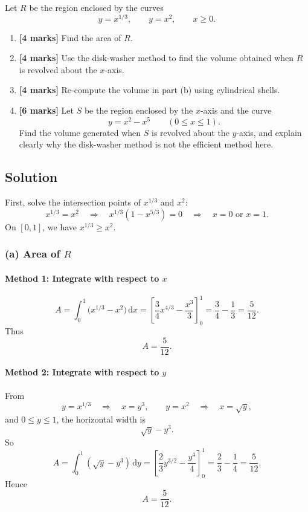 \documentclass[12pt]{article}
\newcommand{\dd}{\,\mathrm{d}}
\begin{document}
Let \(R\) be the region enclosed by the curves
\[
y=x^{1/3},
\qquad
y=x^2,
\qquad
x\ge 0.
\]

\begin{enumerate}[label=(\alph*)]
\item \textbf{[4 marks]} Find the area of \(R\).

\item \textbf{[4 marks]} Use the disk-washer method to find the volume obtained when \(R\) is revolved about the \(x\)-axis.

\item \textbf{[4 marks]} Re-compute the volume in part (b) using cylindrical shells.

\item \textbf{[6 marks]} Let \(S\) be the region enclosed by the \(x\)-axis and the curve
\[
y=x^2-x^5
\qquad (0\le x\le 1).
\]
Find the volume generated when \(S\) is revolved about the \(y\)-axis, and explain clearly why the disk-washer method is not the efficient method here.
\end{enumerate}

\subsection{Solution}

First, solve the intersection points of \(x^{1/3}\) and \(x^2\):
\[
x^{1/3}=x^2
\quad\Longrightarrow\quad
x^{1/3}(1-x^{5/3})=0
\quad\Longrightarrow\quad
x=0 \text{ or } x=1.
\]
On \([0,1]\), we have \(x^{1/3}\ge x^2\).

\subsubsection{(a) Area of \(R\)}

\paragraph{Method 1: Integrate with respect to \(x\)}
\[
A=\int_0^1 \bigl(x^{1/3}-x^2\bigr)\dd x
=
\left[\frac{3}{4}x^{4/3}-\frac{x^3}{3}\right]_0^1
=
\frac34-\frac13
=
\frac{5}{12}.
\]
Thus
\[
\boxed{A=\frac{5}{12}.}
\]

\paragraph{Method 2: Integrate with respect to \(y\)}
From
\[
y=x^{1/3}\quad\Longrightarrow\quad x=y^3,
\qquad
y=x^2\quad\Longrightarrow\quad x=\sqrt{y},
\]
and \(0\le y\le 1\), the horizontal width is
\[
\sqrt y-y^3.
\]
So
\[
A=\int_0^1 (\sqrt y-y^3)\dd y
=
\left[\frac{2}{3}y^{3/2}-\frac{y^4}{4}\right]_0^1
=
\frac23-\frac14
=
\frac{5}{12}.
\]
Hence
\[
\boxed{A=\frac{5}{12}.}
\]
\end{document}
